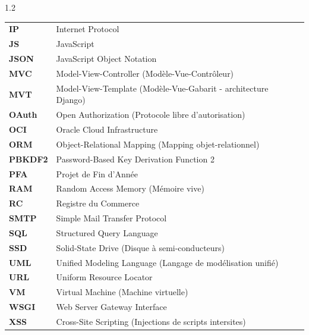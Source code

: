\begin{spacing}{1.2}
\begin{longtable}{p{3cm} >{\raggedright\arraybackslash}p{11cm}}
    \textbf{IP} & Internet Protocol \\
    \textbf{JS} & JavaScript \\
    \textbf{JSON} & JavaScript Object Notation \\
    \textbf{MVC} & Model-View-Controller (Modèle-Vue-Contrôleur) \\
    \textbf{MVT} & Model-View-Template (Modèle-Vue-Gabarit - architecture Django) \\
    \textbf{OAuth} & Open Authorization (Protocole libre d'autorisation) \\
    \textbf{OCI} & Oracle Cloud Infrastructure \\
    \textbf{ORM} & Object-Relational Mapping (Mapping objet-relationnel) \\
    \textbf{PBKDF2} & Password-Based Key Derivation Function 2 \\
    \textbf{PFA} & Projet de Fin d'Année \\
    \textbf{RAM} & Random Access Memory (Mémoire vive) \\
    \textbf{RC} & Registre du Commerce \\
    \textbf{SMTP} & Simple Mail Transfer Protocol \\
    \textbf{SQL} & Structured Query Language \\
    \textbf{SSD} & Solid-State Drive (Disque à semi-conducteurs) \\
    \textbf{UML} & Unified Modeling Language (Langage de modélisation unifié) \\
    \textbf{URL} & Uniform Resource Locator \\
    \textbf{VM} & Virtual Machine (Machine virtuelle) \\
    \textbf{WSGI} & Web Server Gateway Interface \\
    \textbf{XSS} & Cross-Site Scripting (Injections de scripts intersites)
\end{longtable}
\end{spacing}
\newpage
